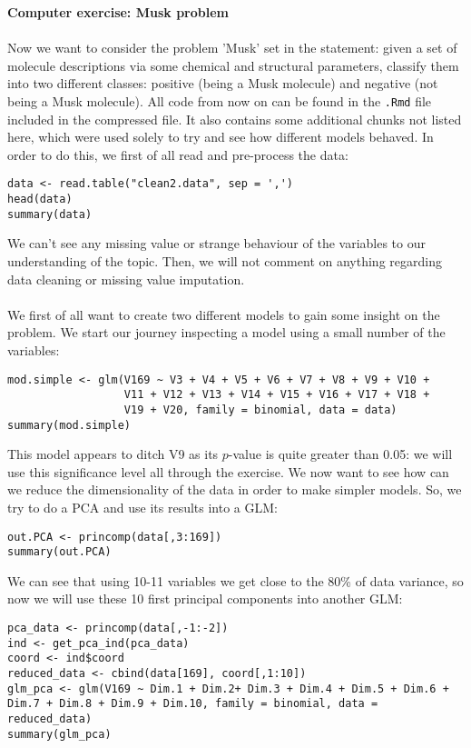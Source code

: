 \documentclass[10pt]{article}
\begin{document}
\newpage
\Huge{\textbf{Computer exercise: Musk problem}} \\ \ \\
\Large
Now we want to consider the problem 'Musk' set in the statement: given a set of molecule descriptions via some chemical and structural parameters, classify them into two different classes: positive (being a Musk molecule) and negative (not being a Musk molecule). All code from now on can be found in the \verb|.Rmd| file included in the compressed file. It also contains some additional chunks not listed here, which were used solely to try and see how different models behaved. In order to do this, we first of all read and pre-process the data:
\begin{verbatim}
data <- read.table("clean2.data", sep = ',')
head(data)
summary(data)
\end{verbatim}
We can't see any missing value or strange behaviour of the variables to our understanding of the topic. Then, we will not comment on anything regarding data cleaning or missing value imputation.
\\ \ \\
We first of all want to create two different models to gain some insight on the problem. We start our journey inspecting a model using a small number of the variables:
\begin{verbatim}
mod.simple <- glm(V169 ~ V3 + V4 + V5 + V6 + V7 + V8 + V9 + V10 +
                  V11 + V12 + V13 + V14 + V15 + V16 + V17 + V18 +
                  V19 + V20, family = binomial, data = data)
summary(mod.simple)
\end{verbatim}
This model appears to ditch V9 as its $p$-value is quite greater than 0.05: we will use this significance level all through the exercise. We now want to see how can we reduce the dimensionality of the data in order to make simpler models. So, we try to do a PCA and use its results into a GLM:
\begin{verbatim}
out.PCA <- princomp(data[,3:169])
summary(out.PCA)
\end{verbatim}
We can see that using 10-11 variables we get close to the 80\% of data variance, so now we will use these 10 first principal components into another GLM:
\begin{verbatim}
pca_data <- princomp(data[,-1:-2])
ind <- get_pca_ind(pca_data)
coord <- ind$coord
reduced_data <- cbind(data[169], coord[,1:10])
glm_pca <- glm(V169 ~ Dim.1 + Dim.2+ Dim.3 + Dim.4 + Dim.5 + Dim.6 + Dim.7 + Dim.8 + Dim.9 + Dim.10, family = binomial, data = reduced_data)
summary(glm_pca)
\end{verbatim}
\end{document}
